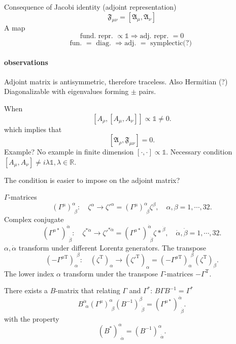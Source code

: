 \begin{correct}
	Consequence of Jacobi identity
	(adjoint representation)
	\begin{equation}
		\mathfrak{F}_{\mu\nu} = [\mathfrak{A}_{\mu},
		\mathfrak{A}_{\nu}]
	\end{equation}
	A map
	\begin{equation}
		\text{fund. repr. } \propto \mathds{1}
		\Longrightarrow \text{adj. repr. }=0
	\end{equation}
	\begin{equation}
		\text{fun. } = \text{ diag. }
		\Longrightarrow \text{adj. } = \text{ symplectic(?) }
	\end{equation}

	\paragraph{observations}
	Adjoint matrix is antisymmetric, therefore traceless.
	Also Hermitian (?)
	Diagonalizable with eigenvalues forming $\pm$ pairs.

	When
	\[
		[A_\rho,[A_\mu,A_\nu]] \propto \mathds{1} \neq 0
	.\] 
	which implies that
	\[
		[\mathfrak{A}_\rho,\mathfrak{F}_{\mu\nu}] = 0
	.\] 
	Example? 
	No example in finite dimension $[\cdot,\cdot]\propto \mathds{1}$.
	Necessary condition $[A_\mu,A_\nu]\neq i\lambda\mathds{1},\lambda\in \mathbb{R}$.

	\begin{idea}
		The condition is easier to impose on the adjoint matrix?
	\end{idea}
\end{correct}

$\Gamma$-matrices
\[
	(\Gamma^\mu)^{\alpha}_{~~\beta}:\quad
	\zeta^\alpha \to {\zeta'}^{\alpha}
	=(\Gamma^\mu)^\alpha_{~~\beta}\zeta^\beta,\quad
	\alpha,\beta=1,\cdots,32
.\] 
Complex conjugate
\[
	(\Gamma^{\mu*})^{\dot{\alpha}}_{~~\dot{\beta}}
	:\quad
	\zeta^{*\dot{\alpha}} \to {\zeta'}^{*\dot{\alpha}}
	= (\Gamma^{\mu*})^{\dot{\alpha}}_{~~\dot{\beta}}
	{\zeta*}^{\dot{\beta}},\quad
	\dot{\alpha},\dot{\beta}=1,\cdots,32
.\] 
$\alpha,\dot{\alpha}$ transform under different Lorentz generators.
The transpose
\[
		 (- \Gamma^{\mu\text{T}})_{\alpha}^{~~\beta}
	:\quad
	(\zeta^{\text{T}})_{\alpha} \to ({\zeta'}^{\text{T}})_{\alpha}
	=  (- \Gamma^{\mu\text{T}})_{\alpha}^{~~\beta}(\zeta^{\text{T}})_\beta
.\] 
The lower index $\alpha$ transform under the transpose $\Gamma$-matrices
$-\Gamma^{\text{T}}$.

There exists a $B$-matrix that relating $\Gamma$ and $\Gamma^*$:
$ B \Gamma B^{-1} = \Gamma^*$
\[
	B^{\dot{\alpha}}_{~~\alpha} (\Gamma^\mu)^\alpha_{~~\beta}
	({B^{-1}})^{\beta}_{~~\dot{\beta}} 
	= (\Gamma^{\mu*})^{\dot{\alpha}}_{~~\dot{\beta}}
.\] 
with the property
\[
	(B^*)^{\alpha}_{~~\dot{\alpha}}
	= (B^{-1})^{\alpha}_{~~\dot{\alpha}}
.\] 

